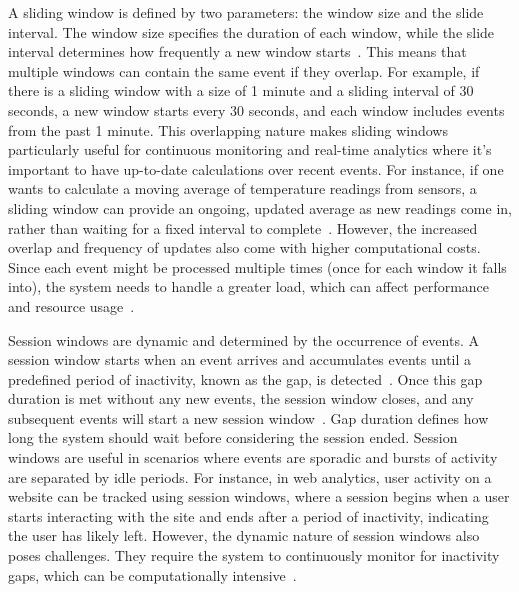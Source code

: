 A sliding window is defined by two parameters: the window size and the slide interval. The window size specifies the duration of each window, while the slide interval determines how frequently a new window starts~\cite{traub2019efficient}. This means that multiple windows can contain the same event if they overlap. For example, if there is a sliding window with a size of 1 minute and a sliding interval of 30 seconds, a new window starts every 30 seconds, and each window includes events from the past 1 minute. This overlapping nature makes sliding windows particularly useful for continuous monitoring and real-time analytics where it's important to have up-to-date calculations over recent events. For instance, if one wants to calculate a moving average of temperature readings from sensors, a sliding window can provide an ongoing, updated average as new readings come in, rather than waiting for a fixed interval to complete~\cite{ma2017correction}. However, the increased overlap and frequency of updates also come with higher computational costs. Since each event might be processed multiple times (once for each window it falls into), the system needs to handle a greater load, which can affect performance and resource usage~\cite{traub2019efficient, carbone2019stream}.

Session windows are dynamic and determined by the occurrence of events. A session window starts when an event arrives and accumulates events until a predefined period of inactivity, known as the gap, is detected~\cite{Akidau:2015:DMP:2824032.2824076}. Once this gap duration is met without any new events, the session window closes, and any subsequent events will start a new session window~\cite{traub2019efficient}. Gap duration defines how long the system should wait before considering the session ended. Session windows are useful in scenarios where events are sporadic and bursts of activity are separated by idle periods. For instance, in web analytics, user activity on a website can be tracked using session windows, where a session begins when a user starts interacting with the site and ends after a period of inactivity, indicating the user has likely left. However, the dynamic nature of session windows also poses challenges. They require the system to continuously monitor for inactivity gaps, which can be computationally intensive~\cite{traub2019efficient}.

